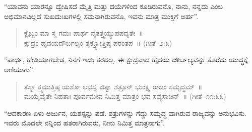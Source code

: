 “ಯಾವನು ಯಾರನ್ನೂ ದ್ವೇಷಿಸದೆ ಮೈತ್ರಿ ಮತ್ತು ದಯೆಗಳಿಂದ ಕೂಡಿರುವನೊ, ನಾನು, ನನ್ನದು ಎಂಬ ಅಭಿಮಾನವಿಲ್ಲದೆ ಸುಖದುಃಖಗಳಲ್ಲಿ ಸಮನಾಗಿರುವನೊ, ಇವನು ಮಾತ್ರ ಮುಕ್ತಿಗೆ ಅರ್ಹ”.

\vspace{-0.2cm}

\begin{verse}
ಕ್ಲೈಬ್ಯಂ ಮಾ ಸ್ಮ ಗಮಃ ಪಾರ್ಥ ನೈತತ್ತ್ವಯ್ಯುಪಪದ್ಯತೇ~॥\\ಕ್ಷುದ್ರಂ ಹೃದಯದೌರ್ಬಲ್ಯಂ ತ್ಯಕ್ತ್ವೋತ್ತಿಷ್ಠ ಪರಂತಪ~॥ (ಗೀತೆ–೨:೩)
\end{verse}

\vspace{-0.2cm}

“ಪಾರ್ಥ, ಹೇಡಿಯಾಗಬೇಡ, ನಿನಗೆ ಇದು ತರವಲ್ಲ. ಈ ಕ್ಷುದ್ರವಾದ ಹೃದಯ ದೌರ್ಬಲ್ಯವನ್ನು ತೊರೆದು ಯುದ್ಧಕ್ಕೆ ಅಣಿಯಾಗು”.


\vspace{-0.2cm}

\begin{verse}
ತಸ್ಮಾ ತ್ತ್ವಮುತ್ತಿಷ್ಠ ಯಶೋ ಲಭಸ್ವ ಜಿತ್ವಾ ಶತ್ರೂನ್​ ಭುಂಕ್ಷ್ವ ರಾಜಂ ಸಮೃದ್ಧಮ್​~॥\\
ಮಯೈವೈತೇ ನಿಹತಾಃ ಪೂರ್ವಮೇವ ನಿಮಿತ್ತ ಮಾತ್ರಂ ಭವ ಸವ್ಯಸಾಚಿನ್​~॥ (ಗೀತೆ–೧೧:೩೩)
\end{verse}

\vspace{-0.2cm}


“ಆದಕಾರಣ ಏಳು ಅರ್ಜುನ, ಯಶಸ್ಸನ್ನು ಪಡೆ. ಶತ್ರುಗಳನ್ನು ಗೆದ್ದು ಸಮೃದ್ಧ ವಾಗಿರುವ ರಾಜ್ಯವನ್ನು ಅನುಭವಿಸು. ಇವರು ಮೊದಲೇ ನನ್ನಿಂದ ಹತರಾಗಿರುವರು, ನೀನು ನಿಮಿತ್ತ ಮಾತ್ರನಾಗು”.

